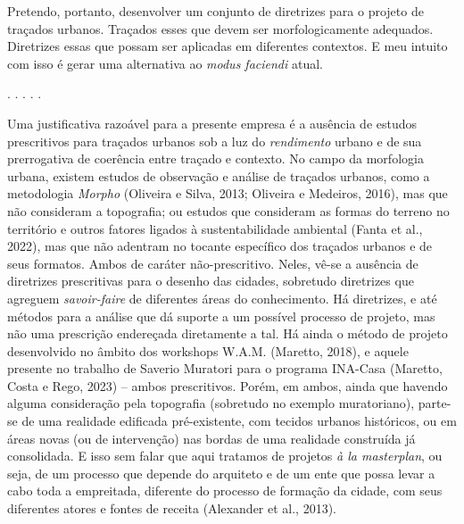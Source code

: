 \documentclass[]{report}
\begin{document}
	Pretendo, portanto, desenvolver um conjunto de diretrizes para o projeto de traçados urbanos. Traçados esses que devem ser morfologicamente adequados. Diretrizes essas que possam ser aplicadas em diferentes contextos. E meu intuito com isso é gerar uma alternativa ao \textit{modus faciendi} atual. 
	
	\begin{center}
		. . . . .
	\end{center}

	Uma justificativa razoável para a presente empresa é a ausência de estudos prescritivos para traçados urbanos sob a luz do \textit{rendimento} urbano e de sua prerrogativa de coerência entre traçado e contexto. No campo da morfologia urbana, existem estudos de observação e análise de traçados urbanos, como a metodologia \textit{Morpho} (Oliveira e Silva, 2013; Oliveira e Medeiros, 2016), mas que não consideram a topografia; ou estudos que consideram as formas do terreno no território e outros fatores ligados à sustentabilidade ambiental (Fanta et al., 2022), mas que não adentram no tocante específico dos traçados urbanos e de seus formatos. Ambos de caráter não-prescritivo. Neles, vê-se a ausência de diretrizes prescritivas para o desenho das cidades, sobretudo diretrizes que agreguem \textit{savoir-faire} de diferentes áreas do conhecimento. Há diretrizes, e até métodos para a análise que dá suporte a um possível processo de projeto, mas não uma prescrição endereçada diretamente a tal. Há ainda o método de projeto desenvolvido no âmbito dos workshops W.A.M. (Maretto, 2018), e aquele presente no trabalho de Saverio Muratori para o programa INA-Casa (Maretto, Costa e Rego, 2023) – ambos prescritivos. Porém, em ambos, ainda que havendo alguma consideração pela topografia (sobretudo no exemplo muratoriano), parte-se de uma realidade edificada pré-existente, com tecidos urbanos históricos, ou em áreas novas (ou de intervenção) nas bordas de uma realidade construída já consolidada. E isso sem falar que aqui tratamos de projetos \textit{à la masterplan}, ou seja, de um processo que depende do arquiteto e de um ente que possa levar a cabo toda a empreitada, diferente do processo de formação da cidade, com seus diferentes atores e fontes de receita (Alexander et al., 2013).
\end{document}
